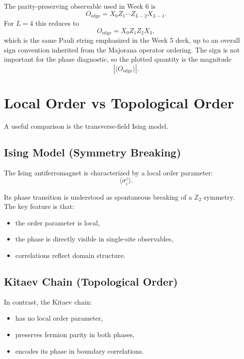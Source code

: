 \documentclass[11pt]{article}
\newcommand{\Oedge}{X_0 Z_1\cdots Z_{L-2} X_{L-1}}
\begin{document}
The parity-preserving observable used in Week 6 is
\begin{equation}
  O_{\mathrm{edge}} = \Oedge.
\end{equation}
For $L=4$ this reduces to
\begin{equation}
  O_{\mathrm{edge}} = X_0 Z_1 Z_2 X_3,
\end{equation}
which is the same Pauli string emphasized in the Week 5 deck, up to an overall sign convention inherited from the Majorana operator ordering. The sign is not important for the phase diagnostic, so the plotted quantity is the magnitude
\begin{equation}
  |\langle O_{\mathrm{edge}}\rangle|.
\end{equation}
\section{Local Order vs Topological Order}

A useful comparison is the transverse-field Ising model.

\subsection*{Ising Model (Symmetry Breaking)}
The Ising antiferromagnet is characterized by a local order parameter:
\begin{equation}
  \langle \sigma_i^z \rangle.
\end{equation}

Its phase transition is understood as spontaneous breaking of a $\mathbb{Z}_2$ symmetry. The key feature is that:
\begin{itemize}
  \item the order parameter is local,
  \item the phase is directly visible in single-site observables,
  \item correlations reflect domain structure.
\end{itemize}

\subsection*{Kitaev Chain (Topological Order)}
In contrast, the Kitaev chain:
\begin{itemize}
  \item has no local order parameter,
  \item preserves fermion parity in both phases,
  \item encodes its phase in boundary correlations.
\end{itemize}
\end{document}
